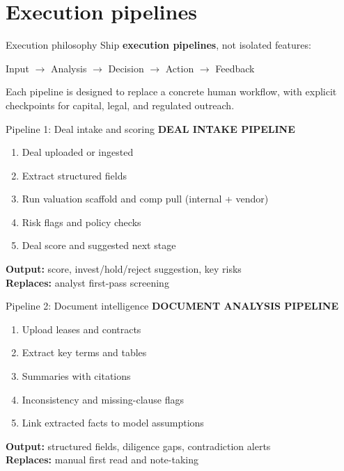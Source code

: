 \documentclass[aspectratio=169,11pt]{beamer}
\begin{document}
\section{Execution pipelines}

\begin{frame}{Execution philosophy}
  \small
  Ship \textbf{execution pipelines}, not isolated features:
  \begin{center}
    Input $\rightarrow$ Analysis $\rightarrow$ Decision $\rightarrow$ Action $\rightarrow$ Feedback
  \end{center}
  Each pipeline is designed to replace a concrete human workflow, with explicit checkpoints for capital, legal, and regulated outreach.
\end{frame}

\begin{frame}{Pipeline 1: Deal intake and scoring}
  \small
  \textbf{DEAL INTAKE PIPELINE}
  \begin{enumerate}
    \item Deal uploaded or ingested
    \item Extract structured fields
    \item Run valuation scaffold and comp pull (internal + vendor)
    \item Risk flags and policy checks
    \item Deal score and suggested next stage
  \end{enumerate}
  \textbf{Output:} score, invest/hold/reject suggestion, key risks\\
  \textbf{Replaces:} analyst first-pass screening
\end{frame}

\begin{frame}{Pipeline 2: Document intelligence}
  \small
  \textbf{DOCUMENT ANALYSIS PIPELINE}
  \begin{enumerate}
    \item Upload leases and contracts
    \item Extract key terms and tables
    \item Summaries with citations
    \item Inconsistency and missing-clause flags
    \item Link extracted facts to model assumptions
  \end{enumerate}
  \textbf{Output:} structured fields, diligence gaps, contradiction alerts\\
  \textbf{Replaces:} manual first read and note-taking
\end{frame}
\end{document}
